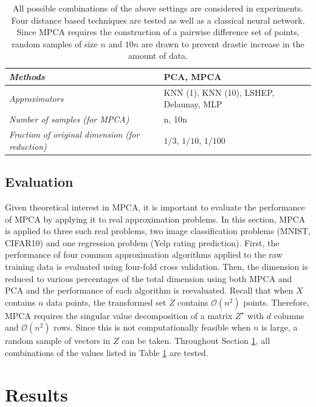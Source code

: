 \documentclass{scspaperproc}
\theoremstyle{scsthe}
\begin{document}
\begin{table}
  \centering
  \renewcommand{\arraystretch}{1.2}
  \begin{tabular}{l l}
    \hline
    \textit{Methods} & PCA, MPCA \\
    \hline
    \textit{Approximators} & KNN (1), KNN (10), LSHEP, Delaunay, MLP \\
    \hline
    \textit{Number of samples (for MPCA)} & n, 10n \\
    \hline
    \textit{Fraction of original dimension (for reduction)} & $1/3$, $1/10$, $1/100$ \\
    \hline
  \end{tabular}
  \vspace{5mm}
  \caption{All possible combinations of the above settings are
    considered in experiments. Four distance based techniques are
    tested as well as a classical neural network. Since MPCA requires
    the construction of a pairwise difference set of points, random
    samples of size $n$ and $10n$ are drawn to prevent drastic
    increase in the amount of data.}
  \label{tab:evaluation}
\end{table}

\subsection{Evaluation}

Given theoretical interest in MPCA, it is important to evaluate the
performance of MPCA by applying it to real approximation problems. In
this section, MPCA is applied to three such real problems, two image
classification problems (MNIST, CIFAR10) and one regression problem
(Yelp rating prediction). First, the performance of four common
approximation algorithms applied to the raw training data is evaluated
using four-fold cross validation. Then, the dimension is reduced to
various percentages of the total dimension using both MPCA and PCA and
the performance of each algorithm is reevaluated. Recall that when $X$
contains $n$ data points, the transformed set $Z$ contains
$\mathcal{O}(n^2)$ points. Therefore, MPCA requires the singular value
decomposition of a matrix $\displaystyle Z^\star$ with $d$ columns and
$\mathcal{O}(n^2)$ rows.  Since this is not computationally feasible
when $n$ is large, a random sample of vectors in $Z$ can be
taken. Throughout Section \ref{sec:results}, all combinations of the
values listed in Table \ref{tab:evaluation} are tested.


\section{Results}
\label{sec:results}
\end{document}
